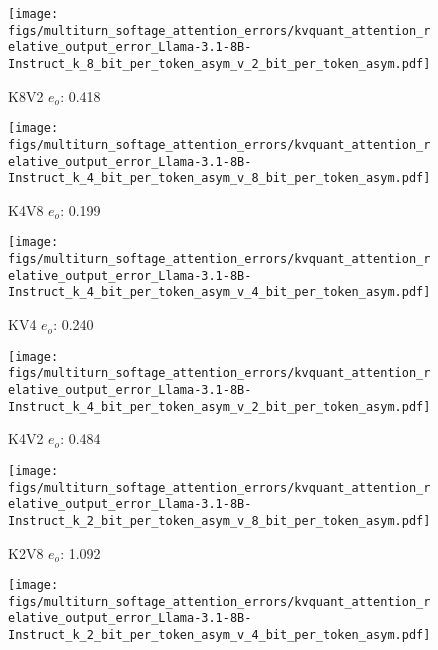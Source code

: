 \begin{figure*}
    \begin{subfigure}{0.25\columnwidth}
    \texttt{[image: figs/multiturn\_softage\_attention\_errors/kvquant\_attention\_relative\_output\_error\_Llama-3.1-8B-Instruct\_k\_8\_bit\_per\_token\_asym\_v\_2\_bit\_per\_token\_asym.pdf]}
    \caption{K8V2 $e_o$: 0.418}
    \label{fig:kvcache_simulated_quant_error_layer_wise_k8v2_per_token_asym_Llama3.1-8B-Instruct_multirurn_softage}
    \end{subfigure}
    \begin{subfigure}{0.25\columnwidth}
    \texttt{[image: figs/multiturn\_softage\_attention\_errors/kvquant\_attention\_relative\_output\_error\_Llama-3.1-8B-Instruct\_k\_4\_bit\_per\_token\_asym\_v\_8\_bit\_per\_token\_asym.pdf]}
    \caption{K4V8 $e_o$: 0.199}
    \label{fig:kvcache_simulated_quant_error_layer_wise_k4v8_per_token_asym_Llama3.1-8B-Instruct_multirurn_softage}
    \end{subfigure}
    \begin{subfigure}{0.25\columnwidth}
    \texttt{[image: figs/multiturn\_softage\_attention\_errors/kvquant\_attention\_relative\_output\_error\_Llama-3.1-8B-Instruct\_k\_4\_bit\_per\_token\_asym\_v\_4\_bit\_per\_token\_asym.pdf]}
    \caption{KV4 $e_o$: 0.240}
    \label{fig:kvcache_simulated_quant_error_layer_wise_k4v4_per_token_asym_Llama3.1-8B-Instruct_multirurn_softage}
    \end{subfigure}
    \begin{subfigure}{0.25\columnwidth}
    \texttt{[image: figs/multiturn\_softage\_attention\_errors/kvquant\_attention\_relative\_output\_error\_Llama-3.1-8B-Instruct\_k\_4\_bit\_per\_token\_asym\_v\_2\_bit\_per\_token\_asym.pdf]}
    \caption{K4V2 $e_o$: 0.484}
    \label{fig:kvcache_simulated_quant_error_layer_wise_k4v2_per_token_asym_Llama3.1-8B-Instruct_multirurn_softage}
    \end{subfigure}
    \begin{subfigure}{0.25\columnwidth}
    \texttt{[image: figs/multiturn\_softage\_attention\_errors/kvquant\_attention\_relative\_output\_error\_Llama-3.1-8B-Instruct\_k\_2\_bit\_per\_token\_asym\_v\_8\_bit\_per\_token\_asym.pdf]}
    \caption{K2V8 $e_o$: 1.092}
    \label{fig:kvcache_simulated_quant_error_layer_wise_k2v8_per_token_asym_Llama3.1-8B-Instruct_multirurn_softage}
    \end{subfigure}
    \begin{subfigure}{0.25\columnwidth}
    \texttt{[image: figs/multiturn\_softage\_attention\_errors/kvquant\_attention\_relative\_output\_error\_Llama-3.1-8B-Instruct\_k\_2\_bit\_per\_token\_asym\_v\_4\_bit\_per\_token\_asym.pdf]}

\end{subfigure}
\end{figure*}
